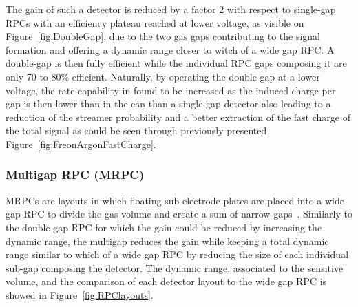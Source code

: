 	The gain of such a detector is reduced by a factor 2 with respect to single-gap RPCs with an efficiency plateau reached at lower voltage, as visible on Figure~\ref{fig:DoubleGap}, due to the two gas gaps contributing to the signal formation and offering a dynamic range closer to witch of a wide gap RPC. A double-gap is then fully efficient while the individual RPC gaps composing it are only 70 to 80\% efficient. Naturally, by operating the double-gap at a lower voltage, the rate capability in found to be increased as the induced charge per gap is then lower than in the can than a single-gap detector also leading to a reduction of the streamer probability and a better extraction of the fast charge of the total signal as could be seen through previously presented Figure~\ref{fig:FreonArgonFastCharge}.
	
		\subsubsection{Multigap RPC (MRPC)}
		\label{chapt4:sssec:MRPC}
	
	MRPCs are layouts in which floating sub electrode plates are placed into a wide gap RPC to divide the gas volume and create a sum of narrow gaps~\cite{ZEBALLOS96MRPC,WILLIAMS98}. Similarly to the double-gap RPC for which the gain could be reduced by increasing the dynamic range, the multigap reduces the gain while keeping a total dynamic range similar to which of a wide gap RPC by reducing the size of each individual sub-gap composing the detector. The dynamic range, associated to the sensitive volume, and the comparison of each detector layout to the wide gap RPC is showed in Figure~\ref{fig:RPClayouts}.
	
